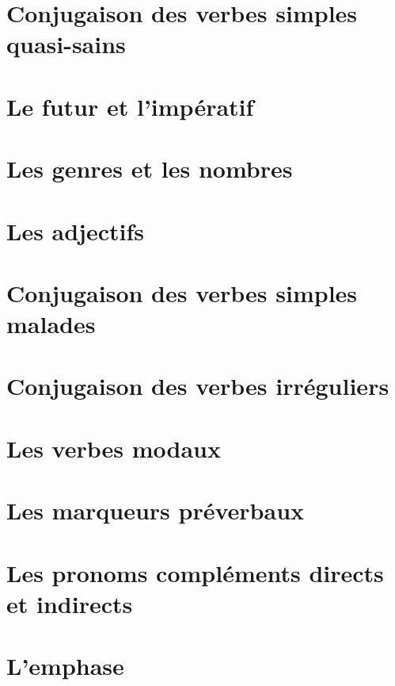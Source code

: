 \documentclass[draft]{book}
\begin{document}




\tableofcontents















\chapter{Conjugaison des verbes simples quasi-sains}

\chapter{Le futur et l'impératif}

\chapter{Les genres et les nombres}

\chapter{Les adjectifs}

\chapter{Conjugaison des verbes simples malades}

\chapter{Conjugaison des verbes irréguliers}

\chapter{Les verbes modaux}\label{VerbMod}

\chapter{Les marqueurs préverbaux}\label{MarqPVer}

\chapter{Les pronoms compléments directs et indirects} \label{PronCompl}

\chapter{L'emphase}
\label{Emphase}
\end{document}
